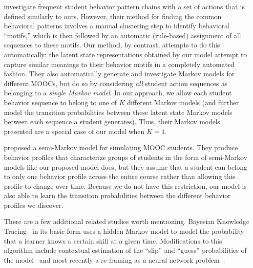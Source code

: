 \citet{Davis:2016:EDM} investigate frequent student behavior pattern chains
with a set of actions that is defined similarly to ours. However, their
method for finding the common behavioral patterns involves a manual
clustering step to identify behavioral ``motifs,'' which is then followed
by an automatic (rule-based) assignment of all sequences to these motifs.
Our method, by contrast, attempts to do this automatically: the latent
state representations obtained by our model attempt to capture similar
meanings to their behavior motifs in a completely automated fashion. They
also automatically generate and investigate Markov models for different
MOOCs, but do so by considering \emph{all} student action sequences as
belonging to a \emph{single Markov model}. In our approach, we allow each
student behavior sequence to belong to one of $K$ different Markov models
(and further model the transition probabilities between these latent state
Markov models between each sequence a student generates). Thus, their
Markov models presented are a special case of our model when $K = 1$.

\citet{Faucon:2016:EDM} proposed a semi-Markov model for simulating MOOC
students. They produce behavior profiles that characterize groups of
students in the form of semi-Markov models like our proposed model does,
but they assume that a student can belong to only one behavior profile
across the entire course rather than allowing this profile to change over
time. Because we do not have this restriction, our model is also able to
learn the transition probabilities between the different behavior profiles
we discover.

There are a few additional related studies worth mentioning.
Bayesian Knowledge Tracing~\cite{Corbett:1994:UMUAI} in its basic form uses
a hidden Markov model to model the probability that a learner knows a
certain skill at a given time. Modifications to this algorithm include
contextual estimation of the ``slip'' and ``guess'' probabilities of the
model~\cite{Baker:2008:ITS} and most recently a re-framing as a neural
network problem~\cite{Piech:2015:NIPS}.

